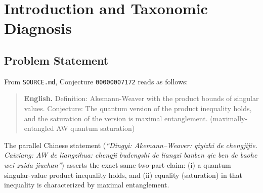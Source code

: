\documentclass[11pt,a4paper]{article}
\theoremstyle{plain}
\theoremstyle{definition}
\newcommand{\C}{\mathbb{C}}
\newcommand{\SU}{\mathrm{SU}}
\begin{document}
\begin{abstract}
\begin{enumerate}
  \item \textbf{Pure-State Schmidt Singular-Value Partial Products ($\mathcal{M}_3$):} For normalized pure states $|\psi\rangle \in \C^d \otimes \C^d$ with Schmidt singular values $s_1 \ge \dots \ge s_d \ge 0$ ($\sum_{j=1}^d s_j^2 = 1$), the \emph{single full $d$-fold determinant bound} $\prod_{j=1}^d s_j^2 \le d^{-d}$ is uniquely saturated at maximal entanglement ($s_j^2 = 1/d$), explaining the intuition behind the conjecture. However, \textbf{every proper $k$-fold partial product} ($1 \le k < d$) satisfies the sharp upper bound $\prod_{j=1}^k s_j^2 \le k^{-k}$, uniquely saturated by non-maximally-entangled Schmidt-rank-$k$ states ($k = 1$: unentangled product states), while maximally entangled states strictly fail ($d^{-k} < k^{-k}$) and in fact achieve the \emph{global minimum} $s_1^2 = 1/d$ at $k = 1$.
  \item \textbf{Kronecker Tensor Products \& Quantum Marginal Spectra ($\mathcal{M}_4$) and Agnihotri--Woodward $\SU(d^2)$ Bounds ($\mathcal{M}_5$):} Naive Kronecker upper bounds fail ($8 > 4$ at $d=2, k=2$), bipartite density spectra $\sigma(\rho_{AB})$ and $\sigma(\rho_A \otimes \rho_B)$ are multiplicatively incomparable on maximally entangled states while equal on product states, and Agnihotri--Woodward quantum Schubert facets on $\SU(d^2)$ are saturated by non-entangling local diagonal unitaries $D_A \otimes I_B$.
\end{enumerate}
All core positive theorems and rational counterexamples are formally verified from first principles in Core Lean~4.19.0 (zero external dependencies, zero \texttt{sorry}) and independently validated in Python.
\end{abstract}

\section{Introduction and Taxonomic Diagnosis}

\subsection{Problem Statement}
From \texttt{SOURCE.md}, Conjecture \texttt{00000007172} reads as follows:
\begin{quote}
\textbf{English.} Definition: Akemann-Weaver with the product bounds of singular values. Conjecture: The quantum version of the product inequality holds, and the saturation of the version is maximal entanglement. (maximally-entangled AW quantum saturation)
\end{quote}
The parallel Chinese statement (\emph{``Dingyi: Akemann--Weaver: qiyizhi de chengjijie. Caixiang: AW de liangzihua: chengji budengshi de liangzi banben qie ben de baohe wei zuida jiuchan''}) asserts the exact same two-part claim: (i) a quantum singular-value product inequality holds, and (ii) equality (saturation) in that inequality is characterized by maximal entanglement.
\end{document}
